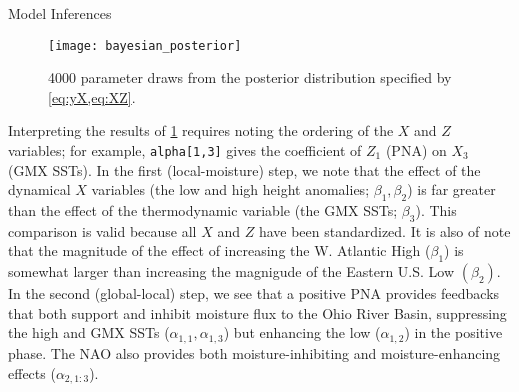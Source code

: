 \begin{block}{Model Inferences}
    \begin{figure}
        \centering
        \texttt{[image: bayesian\_posterior]}
        \caption{\num{4000} parameter draws from the posterior distribution specified by \cref{eq:yX,eq:XZ}.}
        \label{fig:posterior}
    \end{figure}
    Interpreting the results of \cref{fig:posterior} requires noting the ordering of the $X$ and $Z$ variables; for example, \texttt{alpha[1,3]} gives the coefficient of $Z_{1}$ (PNA) on $X_3$ (GMX SSTs).
    In the first (local-moisture) step, we note that the effect of the dynamical $X$ variables (the low and high height anomalies; $\beta_1, \beta_2$) is far greater than the effect of the thermodynamic variable (the GMX SSTs; $\beta_3$).
    This comparison is valid because all $X$ and $Z$ have been standardized.
    It is also of note that the magnitude of the effect of increasing the W. Atlantic High ($\beta_1$) is somewhat larger than increasing the magnigude of the Eastern U.S. Low $(\beta_2)$.
    In the second (global-local) step, we see that a positive PNA provides feedbacks that both support and inhibit moisture flux to the Ohio River Basin, suppressing the high and GMX SSTs ($\alpha_{1,1}, \alpha_{1,3}$) but enhancing the low ($\alpha_{1,2}$) in the positive phase.
    The NAO also provides both moisture-inhibiting and moisture-enhancing effects ($\alpha_{2,1:3}$).
\end{block}
